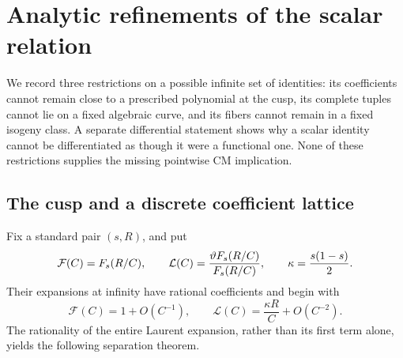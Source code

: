 \section{Analytic refinements of the scalar relation}
\label{rev:analytic-refinements}

We record three restrictions on a possible infinite set of identities:
its coefficients cannot remain close to a prescribed polynomial at the
cusp, its complete tuples cannot lie on a fixed algebraic curve, and its
fibers cannot remain in a fixed isogeny class. A separate differential
statement shows why a scalar identity cannot be differentiated as though
it were a functional one. None of these restrictions supplies the missing
pointwise CM implication.

\subsection{The cusp and a discrete coefficient lattice}
\label{sec:restricted-finiteness}
\label{sec:polynomial-avoidance}

Fix a standard pair $(s,R)$, and put
\[
 \mathcal F(C)=F_s(R/C),\qquad
 \mathcal L(C)=\frac{\vartheta F_s(R/C)}{F_s(R/C)},\qquad
 \kappa=\frac{s(1-s)}2.
\]
Their expansions at infinity have rational coefficients and begin with
\begin{equation}\label{rev:eq:cusp-expansion}
 \mathcal F(C)=1+O(C^{-1}),\qquad
 \mathcal L(C)=\frac{\kappa R}{C}+O(C^{-2}).
\end{equation}
The rationality of the entire Laurent expansion, rather than its first
term alone, yields the following separation theorem.

